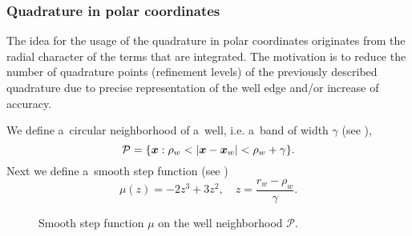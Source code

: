 \subsubsection{Quadrature in polar coordinates}

The idea for the usage of the quadrature in polar coordinates originates from the radial character of the terms
that are integrated. 
The motivation is to reduce the number of quadrature points (refinement levels) of the previously described quadrature due to
precise representation of the well edge and/or increase of accuracy.

We define a~circular neighborhood of a~well, i.e. a~band of width $\gamma$ (see ),
\[ \mathcal{P} = \{\mathbf{\boldsymbol{x}}: \rho_w < \left|\mathbf{\boldsymbol{x}} - \mathbf{\boldsymbol{x}}_w\right| < \rho_w + \gamma \}.\]
Next we define a~smooth step function (see )
\[\mu(z) = -2 z^3 +3 z^2,\quad z=\frac{r_w-\rho_w}{\gamma}.\]%
%
\begin{figure}[!htb]
  \vspace{-35pt}
  \centering    
  \hspace{0pt}
  \caption[Smooth step function]
  {Smooth step function $\mu$ on the well neighborhood $\mathcal{P}$.
  }
  \label{fig:smooth_step_well_band}
\end{figure}    

